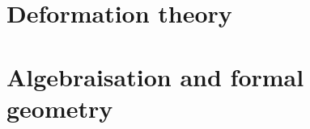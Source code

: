     \chapter{Deformation theory}
        \begin{abstract}
            
        \end{abstract}
        
        \minitoc
    
        
        
        
        
        
        
    \chapter{Algebraisation and formal geometry}
        \begin{abstract}
            
        \end{abstract}
        
        \minitoc
        
        
        
        
	
	\printbibliography

